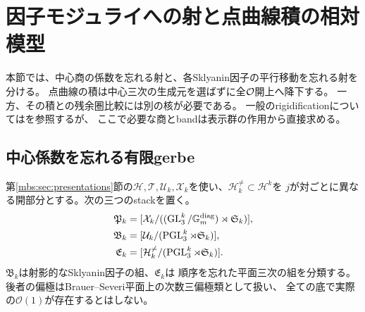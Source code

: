 \section{因子モジュライへの射と点曲線積の相対模型}
\label{mbfm:sec:factor-moduli}

本節では、中心商の係数を忘れる射と、各Sklyanin因子の平行移動を忘れる射を分ける。
点曲線の積は中心三次の生成元を選ばずに全$\mathcal O$開上へ降下する。
一方、その積との残余圏比較には別の核が必要である。
一般のrigidificationについては\cite[Theorem~5.1]{MBFMRomagny}を参照するが、
ここで必要な商とbandは表示群の作用から直接求める。

\subsection{中心係数を忘れる有限gerbe}

第\ref{mbs:sec:presentations}節の$\mathcal H,\mathcal T,\mathcal U_k,
\mathcal X_k$を使い、$\mathcal H_k^{\ne}\subset\mathcal H^k$を
$j$が対ごとに異なる開部分とする。次の三つのstackを置く。
\begin{equation}\label{mbfm:eq:three-stacks}
\begin{aligned}
 \mathfrak P_k&=[\mathcal X_k/
 ((\operatorname{GL}_3^k/\mathbb G_m^{\rm diag})\rtimes\mathfrak S_k)],\\
 \mathfrak B_k&=[\mathcal U_k/(\operatorname{PGL}_3^k\rtimes\mathfrak S_k)],\\
 \mathfrak E_k&=[\mathcal H_k^{\ne}/(\operatorname{PGL}_3^k\rtimes\mathfrak S_k)].
\end{aligned}
\end{equation}
$\mathfrak B_k$は射影的なSklyanin因子の組、$\mathfrak E_k$は
順序を忘れた平面三次の組を分類する。
後者の偏極はBrauer--Severi平面上の次数三偏極類として扱い、
全ての底で実際の$\mathcal O(1)$が存在するとはしない。

